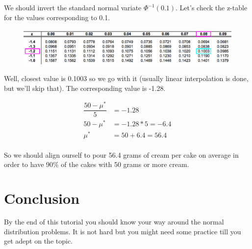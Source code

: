 \documentclass[]{book}
\theoremstyle{definition}
\theoremstyle{definition}
\theoremstyle{definition}
\theoremstyle{remark}
\begin{document}
We should invert the standard normal variate \(\Phi^{-1}(0.1)\). Let's
check the z-table for the values corresponding to 0.1.

\begin{figure}
\begin{center}
\includegraphics[width=0.95\columnwidth]{img/ss4}
\end{center}
\end{figure}

Well, closest value is 0.1003 so we go with it (usually linear
interpolation is done, but we'll skip that). The corresponding value is
-1.28.

\begin{align*}
\dfrac{50 - \mu^*}{5} &= -1.28 \\
50 - \mu^* &= -1.28*5 = -6.4 \\
\mu^* &= 50 + 6.4 = 56.4 \\
\end{align*}

So we should align ourself to pour 56.4 grams of cream per cake on
average in order to have 90\% of the cakes with 50 grams or more cream.

\hypertarget{conclusion}{%
\section{Conclusion}\label{conclusion}}

By the end of this tutorial you should know your way around the normal
distribution problems. It is not hard but you might need some practice
till you get adept on the topic.


\end{document}
